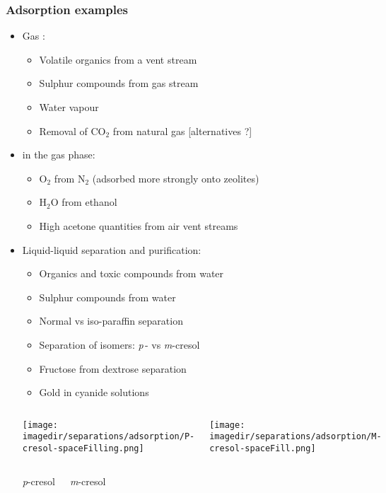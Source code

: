 \begin{frame}\frametitle{Adsorption examples}
	\begin{itemize}
		\item	Gas {\color{purple}{purification}}:
		\begin{itemize}
			\item	Volatile organics from a vent stream
			\item	Sulphur compounds from gas stream
			\item	Water vapour
			\item	Removal of $\text{CO}_2$ from natural gas [alternatives ?]
		\end{itemize}
		\item	{\color{purple}{Bulk separation}} in the gas phase:
		\begin{itemize}
			\item	$\text{O}_2$ from $\text{N}_2$ (adsorbed more strongly onto zeolites) 
			\item	$\text{H}_2\text{O}$ from ethanol
			\item	High acetone quantities from air vent streams
		\end{itemize}
		\item	Liquid-liquid separation and purification:
		\begin{itemize}
			\item	Organics and toxic compounds from water
			\item	Sulphur compounds from water
			\item	Normal vs iso-paraffin separation
			\item	Separation of isomers: \emph{p}$\,$- vs \emph{m}-cresol
			\item	Fructose from dextrose separation
			\item	Gold in cyanide solutions
		\end{itemize}
		\vspace{-2.5cm}
		\begin{columns}[t]
				\begin{center}
					\texttt{[image: \\imagedir/separations/adsorption/P-cresol-spaceFilling.png]}
				\end{center}
				\begin{center}
					\texttt{[image: \\imagedir/separations/adsorption/M-cresol-spaceFill.png]}					
				\end{center}				
		\end{columns}
		\begin{columns}[t]
				\begin{center}
					\emph{p}-cresol
				\end{center}
				\begin{center}
					\emph{m}-cresol
				\end{center}
		\end{columns}
		\hfill{}
		
	\end{itemize}	
\end{frame}

